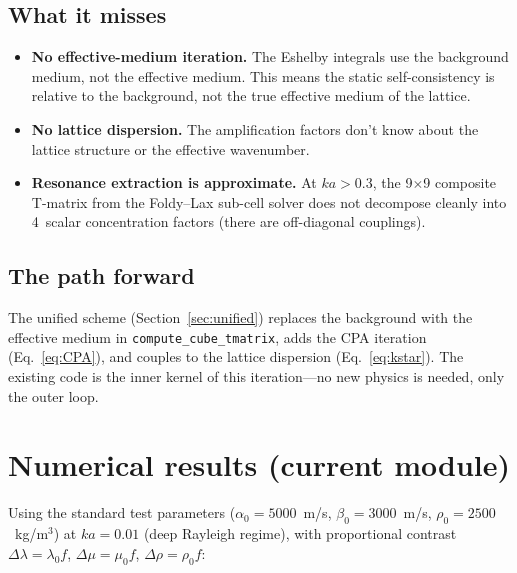 \documentclass[11pt,a4paper]{article}
\newcommand{\D}{\Delta}
\begin{document}
\subsection{What it misses}

\begin{itemize}[nosep]
  \item \textbf{No effective-medium iteration.}  The Eshelby integrals
    use the background medium, not the effective medium.  This means
    the static self-consistency is relative to the background, not
    the true effective medium of the lattice.
  \item \textbf{No lattice dispersion.}  The amplification factors
    don't know about the lattice structure or the effective wavenumber.
  \item \textbf{Resonance extraction is approximate.}  At $ka > 0.3$,
    the 9$\times$9 composite T-matrix from the Foldy--Lax sub-cell
    solver does not decompose cleanly into 4~scalar concentration
    factors (there are off-diagonal couplings).
\end{itemize}

\subsection{The path forward}

The unified scheme (Section~\ref{sec:unified}) replaces the
background with the effective medium in \texttt{compute\_cube\_tmatrix},
adds the CPA iteration (Eq.~\ref{eq:CPA}), and couples to the
lattice dispersion (Eq.~\ref{eq:kstar}).  The existing code is
the inner kernel of this iteration---no new physics is needed,
only the outer loop.

\section{Numerical results (current module)}
\label{sec:results}

Using the standard test parameters ($\alpha_0 = 5000$~m/s,
$\beta_0 = 3000$~m/s, $\rho_0 = 2500$~kg/m$^3$) at $ka = 0.01$
(deep Rayleigh regime), with proportional contrast
$\D\lambda = \lambda_0 f$, $\D\mu = \mu_0 f$, $\D\rho = \rho_0 f$:
\end{document}
